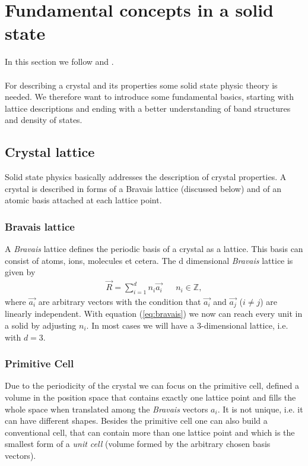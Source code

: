 \chapter{Fundamental concepts in a solid state}
	In this section we follow \cite{Festkoerperphysik_Ashcroft} and \cite{Festkoerperphysik_RG_AM}.\\\\
	For describing a crystal and its properties some solid state physic theory is needed. We therefore want to introduce some fundamental basics, starting with lattice descriptions and ending with a better understanding of band structures and density of states.
	\section{Crystal lattice}
		Solid state physics basically addresses the description of crystal properties. A crystal is described in forms of a Bravais lattice (discussed below) and of an atomic basis attached at each lattice point.
			
		\subsection{Bravais lattice}
			A \textit{Bravais} lattice defines the periodic basis of a crystal as a lattice. This basis can consist of atoms, ions, molecules et cetera. The d dimensional \textit{Bravais} lattice is given by 
			\begin{align}
				\label{eq:bravais}
				\vec{R} = \sum_{i=1}^{d} n_i \vec{a_i} && n_i \in \mathbb{Z},
			\end{align}
			where $\vec{a_i}$ are arbitrary vectors with the condition that $\vec{a_i}$ and $\vec{a_j}$ ($i \neq j$) are linearly independent. With equation (\ref{eq:bravais}) we now can reach every unit in a solid by adjusting $n_i$. In most cases we will have a 3-dimensional lattice, i.e. with $d=3$.
			
		
		\subsection{Primitive Cell}
			\label{sec:primitiveCell}
			Due to the periodicity of the crystal we can focus on the primitive cell, defined a volume in the position space that contains exactly one lattice point and fills the whole space when translated among the \textit{Bravais} vectors $a_i$. 
			It is not unique, i.e. it can have different shapes. Besides the primitive cell one can also build a conventional cell, that can contain more than one lattice point and which is the smallest form of a \textit{unit cell} (volume formed by the arbitrary chosen basis vectors). 
	
